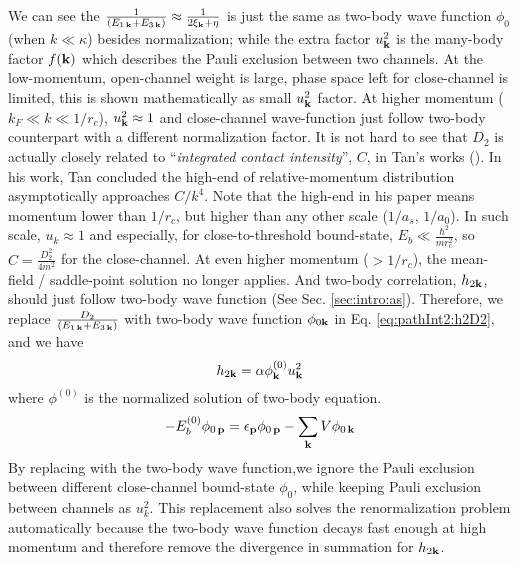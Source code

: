  
 




We can see the $\frac{1}{(E_{1\,\mathbf{k}}+E_{3\,\mathbf{k}})}\approx\frac{1}{2\xi_{\mathbf{k}}+\eta}$ is just the same as two-body wave function $\phi_{0}$ (when $k\ll\kappa$) besides normalization; while the extra factor $u_{\mathbf{k}}^{2}$ is the many-body factor $f(\mathbf{k})$ which describes the Pauli exclusion between two channels.  At the low-momentum, open-channel weight is large, phase space left for close-channel is limited, this is shown mathematically as small $u_{\mathbf{k}}^{2}$ factor.   At higher momentum ($k_{F}\ll{k}\ll1/r_{c}$), $u_{\mathbf{k}}^{2}\approx1$ and close-channel wave-function just follow two-body counterpart with a different normalization factor.   It is not hard to see that $D_{2}$ is actually closely related to ``\emph{integrated contact intensity}'', $C$, in Tan's works (\cite{Tan2008-1,Tan2008-2}).  In his work, Tan concluded  the high-end of relative-momentum distribution asymptotically approaches  $C/k^{4}$.  Note that the high-end in his paper means momentum lower than $1/r_{c}$, but higher than any other scale ($1/a_{s}$, $1/a_{0}$).  In such scale, $u_{k}\approx1$ and especially, for close-to-threshold bound-state, $E_{b}\ll{}\frac{\hbar^{2}}{mr_{c}^{2}}$, so $C=\frac{D_{2}^{2}}{4m^{2}}$ for the close-channel.   
At even higher momentum ($>1/r_{c}$), the mean-field / saddle-point solution no longer applies.  And  two-body correlation, $h_{2\mathbf{k}}$, should just follow two-body wave function (See Sec. \ref{sec:intro:as}).  Therefore, we replace $\frac{D_{2}}{(E_{1\,\mathbf{k}}+E_{3\,\mathbf{k}})}$ with two-body wave function $\phi_{0\mathbf{k}}$ in Eq. \ref{eq:pathInt2:h2D2}, and we have 
\begin{equation}\label{eq:pathInt2:hphi}
h_{2\mathbf{k}}=\alpha\phi^{(0)}_{\mathbf{k}}u_{\mathbf{k}}^{2}
\end{equation}
where $\phi^{(0)}$ is the normalized solution of  two-body \sch equation.
\begin{equation}\label{eq:pathInt2:phi}
-E_{b}^{(0)}\phi_{0\,\mathbf{p}}=\epsilon_{\mathbf{p}}\phi_{0\,\mathbf{p}}-\sum_{\mathbf{k}}V \phi_{0\,\mathbf{k}}
\end{equation}
By replacing with the two-body wave function,we ignore the Pauli exclusion between different close-channel bound-state $\phi_{0}$, while keeping Pauli exclusion between channels as $u_{k}^{2}$.
This replacement also solves the renormalization problem automatically because the two-body wave function decays fast enough at high momentum and therefore remove the divergence in summation for $h_{2\mathbf{k}}$.  


